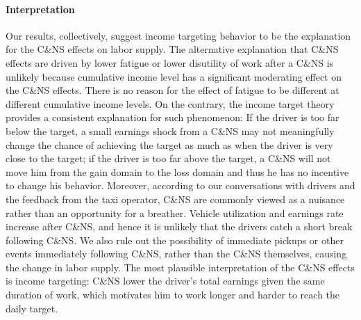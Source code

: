 \documentclass[reviewmode,AEJ]{AEA}
\begin{document}
\paragraph{Interpretation} Our results, collectively, suggest income targeting behavior to be the explanation
for the C\&NS effects on labor supply. The alternative explanation that C\&NS effects are driven by lower
fatigue or lower disutility of work after a C\&NS is unlikely because cumulative income level has a significant 
moderating effect on the C\&NS effects. There is no reason for the effect of fatigue to be different at 
different cumulative income levels. On the contrary, the income target theory provides a consistent explanation
for such phenomenon: If the driver is too far below the target, a small earnings shock from a C\&NS may not
meaningfully change the chance of achieving the target as much as when the driver is very close to the target; 
if the driver is too far above the target, a C\&NS will not move him from the gain domain to the loss domain
and thus he has no incentive to change his behavior. Moreover, according to our conversations with drivers 
and the feedback from the taxi operator, C\&NS are commonly viewed as a nuisance rather than an opportunity
for a breather. Vehicle utilization and earnings rate increase after C\&NS, and hence it is unlikely that
the drivers catch a short break following C\&NS. We also rule out the possibility of immediate pickups or
other events immediately following C\&NS, rather than the C\&NS themselves, causing the change in labor 
supply. The most plausible interpretation of the C\&NS effects is income targeting: C\&NS lower the 
driver's total earnings given the same duration of work, which motivates him to work longer and harder
to reach the daily target. 
\end{document}
